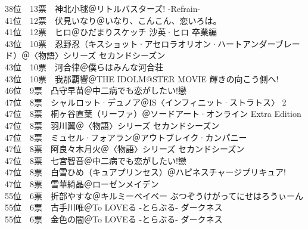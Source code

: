 {    38位　13票　神北小毬＠リトルバスターズ! -Refrain-                                  \\
    41位　12票　伏見いなり＠いなり、こんこん、恋いろは。                               \\
    41位　12票　ヒロ＠ひだまりスケッチ 沙英·ヒロ 卒業編                               \\
    43位　10票　忍野忍（キスショット·アセロラオリオン·ハートアンダーブレード）＠〈物語〉シリーズ セカンドシーズン\\
    43位　10票　河合律＠僕らはみんな河合荘                                                                \\
    43位　10票　我那覇響＠THE IDOLM@STER MOVIE 輝きの向こう側へ!                                          \\
    46位　9票　凸守早苗＠中二病でも恋がしたい!戀                                                          \\
    47位　8票　シャルロット·デュノア＠IS〈インフィニット·ストラトス〉 2                                 \\
    47位　8票　桐ヶ谷直葉（リーファ）＠ソードアート·オンライン Extra Edition                             \\
    47位　8票　羽川翼＠〈物語〉シリーズ セカンドシーズン                                                  \\
    47位　8票　ミュセル·フォアラン＠アウトブレイク·カンパニー                                           \\
    47位　8票　阿良々木月火＠〈物語〉シリーズ セカンドシーズン                                            \\
    47位　8票　七宮智音＠中二病でも恋がしたい!戀                                                          \\
    47位　8票　白雪ひめ（キュアプリンセス）＠ハピネスチャージプリキュア!                                  \\
    47位　8票　雪華綺晶＠ローゼンメイデン                                                                 \\
    55位　6票　折部やすな＠キルミーベイベー ぶつぞうけがってにせはろうぃーん                              \\
    55位　6票　古手川唯＠To LOVEる -とらぶる- ダークネス                                                  \\
    55位　6票　金色の闇＠To LOVEる -とらぶる- ダークネス                                                  \\
}
